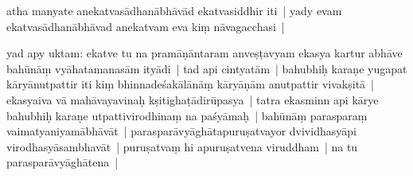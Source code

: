\documentclass[article,12pt,a4paper]{memoir}%
\newcounter{parCount}
\begin{document}
	  
	  \pstart \leavevmode%
	\label{thakur75-55.27}atha manyate anekatvasādhanābhāvād ekatvasiddhir iti | yady evam ekatvasādhanābhāvad anekatvam eva kiṃ nāvagacchasi |
	{}
	\pend%
      

	  
	  \pstart \leavevmode%
	\label{thakur75-55.29}yad apy uktam: \label{ratnakīrtinibandhāvali__36r1NSAZOF4PYRJJ9T4KL5GNBA4}ekatve tu na pramāṇāntaram anveṣṭavyam ekasya kartur abhāve bahūnāṃ vyāhatamanasām ityādi\label{ratnakīrtinibandhāvali__36r1NSAZOF6VPMT1M1P47SSA79H} | \label{ratnakīrtinibandhāvali__36r1NMN5X0PC291R8Q4FO5BKCDN}tad api cintyatām | bahubhiḥ karaṇe yugapat kāryānutpattir iti kiṃ bhinnadeśakālānāṃ kāryāṇām anutpattir vivakṣitā | ekasyaiva vā mahāvayavinaḥ kṣitighaṭādirūpasya | tatra ekasminn api kārye bahubhiḥ karaṇe utpattivirodhinaṃ na paśyāmaḥ | bahūnāṃ parasparaṃ vaimatyaniyamābhāvāt | parasparāvyāghātapuruṣatvayor dvividhasyāpi virodhasyāsambhavāt | puruṣatvaṃ hi apuruṣatvena viruddham | na tu parasparāvyāghātena |
	{}
	\pend%
      
\end{document}
